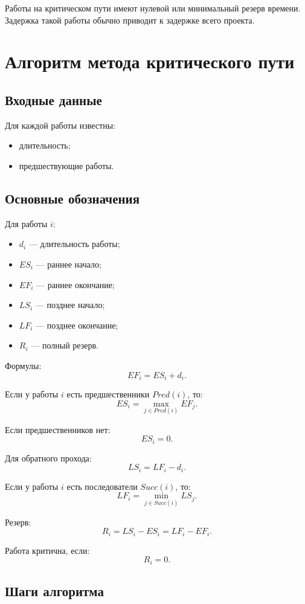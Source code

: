 \documentclass[12pt,a4paper]{article}
\begin{document}
Работы на критическом пути имеют нулевой или минимальный резерв времени. Задержка такой работы обычно приводит к задержке всего проекта.

\section{Алгоритм метода критического пути}

\subsection{Входные данные}

Для каждой работы известны:
\begin{itemize}
    \item длительность;
    \item предшествующие работы.
\end{itemize}

\subsection{Основные обозначения}

Для работы $i$:
\begin{itemize}
    \item $d_i$ --- длительность работы;
    \item $ES_i$ --- раннее начало;
    \item $EF_i$ --- раннее окончание;
    \item $LS_i$ --- позднее начало;
    \item $LF_i$ --- позднее окончание;
    \item $R_i$ --- полный резерв.
\end{itemize}

Формулы:
\[
EF_i = ES_i + d_i.
\]

Если у работы $i$ есть предшественники $Pred(i)$, то:
\[
ES_i = \max_{j \in Pred(i)} EF_j.
\]

Если предшественников нет:
\[
ES_i = 0.
\]

Для обратного прохода:
\[
LS_i = LF_i - d_i.
\]

Если у работы $i$ есть последователи $Succ(i)$, то:
\[
LF_i = \min_{j \in Succ(i)} LS_j.
\]

Резерв:
\[
R_i = LS_i - ES_i = LF_i - EF_i.
\]

Работа критична, если:
\[
R_i = 0.
\]

\subsection{Шаги алгоритма}
\end{document}
